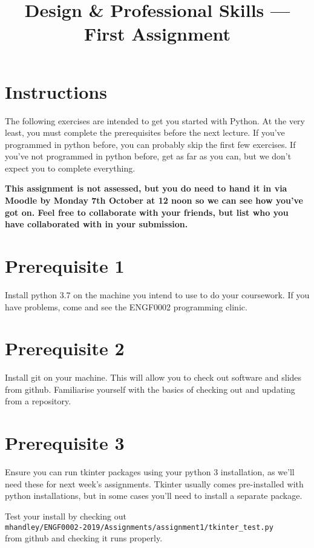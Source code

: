 \documentclass{article}
\title{Design \& Professional Skills --- First Assignment}
\author{}
\date{}
\begin{document}
\maketitle

\section*{Instructions}

The following exercises are intended to get you started with Python.
At the very least, you must complete the prerequisites before the next
lecture.  If you've programmed in python before, you can probably skip
the first few exercises.  If you've not programmed in python before,
get as far as you can, but we don't expect you to complete everything.

\textbf{This assignment is not assessed, but you do need to hand it in
  via Moodle by Monday 7th October at 12 noon so we can see how you've
  got on.  Feel free to collaborate with your friends, but list who
  you have collaborated with in your submission.}

\section*{Prerequisite 1}

Install python 3.7 on the machine you intend to use to do your
coursework.  If you have problems, come and see the ENGF0002
programming clinic.

\section*{Prerequisite 2}

Install git on your machine.  This will allow you to check out
software and slides from github.  Familiarise yourself with the basics
of checking out and updating from a repository.

\section*{Prerequisite 3}

Ensure you can run tkinter packages using your python 3 installation,
as we'll need these for next week's assignments.  Tkinter usually
comes pre-installed with python installations, but in some cases you'll need to
install a separate package.

\vspace{0.1in}\noindent Test your install by checking out\\
\texttt{mhandley/ENGF0002-2019/Assignments/assignment1/tkinter\_test.py}\\
from github and checking it runs properly.
\end{document}
